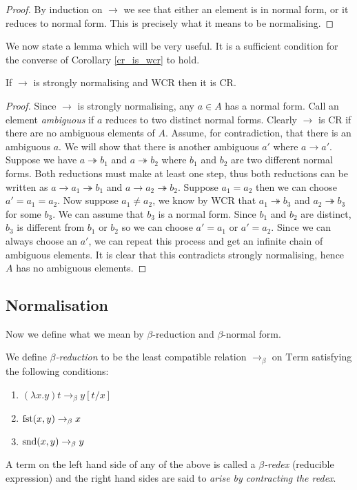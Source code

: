 \begin{proof}
    By induction on $\to$ we see that either an element is in normal form, or it reduces to normal form. This is precisely what it means to be normalising.
\end{proof}

We now state a lemma which will be very useful. It is a sufficient condition for the converse of Corollary \ref{cr_is_wcr} to hold.

\begin{lemma}
    If $\to$ is strongly normalising and WCR then it is CR.
\end{lemma}

\begin{proof}
    Since $\to$ is strongly normalising, any $a \in A$ has a normal form. Call an element \emph{ambiguous} if $a$ reduces to two distinct normal forms. Clearly $\to$ is CR if there are no ambiguous elements of $A$.
    Assume, for contradiction, that there is an ambiguous $a$. We will show that there is another ambiguous $a'$ where $a \to a'$.
    Suppose we have $a \twoheadrightarrow b_1$ and $a \twoheadrightarrow b_2$ where $b_1$ and $b_2$ are two different normal forms. Both reductions must make at least one step, thus both reductions can be written as $a \to a_1 \twoheadrightarrow b_1$ and $a \to a_2 \twoheadrightarrow b_2$.
    Suppose $a_1 = a_2$ then we can choose $a' = a_1 = a_2$. Now suppose $a_1 \neq a_2$, we know by WCR that $a_1 \twoheadrightarrow b_3$ and $a_2 \twoheadrightarrow b_3$ for some $b_3$. We can assume that $b_3$ is a normal form. Since $b_1$ and $b_2$ are distinct, $b_3$ is different from $b_1$ or $b_2$ so we can choose $a' = a_1$ or $a'=a_2$.
    Since we can always choose an $a'$, we can repeat this process and get an infinite chain of ambiguous elements. It is clear that this contradicts strongly normalising, hence $A$ has no ambiguous elements.
\end{proof}

\subsection{Normalisation}

Now we define what we mean by $\beta$-reduction and $\beta$-normal form.

\begin{defin}\label{beta_reduction}
    We define \emph{$\beta$-reduction} to be the least compatible relation $\to_{\beta}$ on $\mathrm{Term}$ satisfying the following conditions:
    \begin{enumerate}
        \item $(\lambda x . y)t \to_{\beta} y [t / x]$
        \item $\mathrm{fst}(x,y) \to_{\beta} x$
        \item $\mathrm{snd}(x,y) \to_{\beta} y$
    \end{enumerate}
    A term on the left hand side of any of the above is called a \emph{$\beta$-redex} (reducible expression) and the right hand sides are said to \emph{arise by contracting the redex}.
\end{defin}


